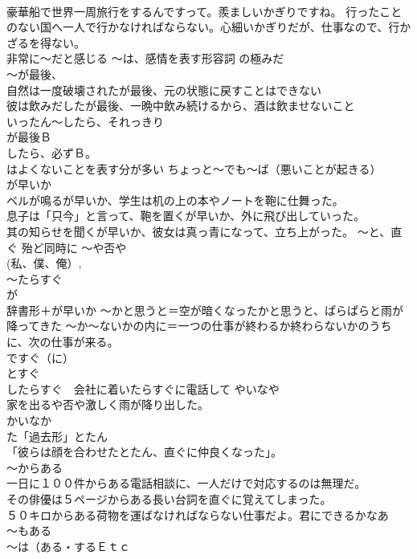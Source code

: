 \documentclass[8pt]{extreport}
\begin{document}
\begin{CJK}{UTF8}{min}
\\	豪華船で世界一周旅行をするんですって。羨ましいかぎりですね。 行ったことのない国へ一人で行かなければならない。心細いかぎりだが、仕事なので、行かざるを得ない。 
\\	非常に～だと感じる ～は、感情を表す形容詞	の極みだ
\\	～が最後、	
\\	自然は一度破壊されたが最後、元の状態に戻すことはできない 
\\	彼は飲みだしたが最後、一晩中飲み続けるから、酒は飲ませないこと 
\\	いったん～したら、それっきり 
\\	が最後Ｂ　　
\\	したら、必ずＢ。　　
\\	はよくないことを表す分が多い	ちょっと～でも～ば（悪いことが起きる）
\\	が早いか
\\	ベルが鳴るが早いか、学生は机の上の本やノートを鞄に仕舞った。
\\	息子は「只今」と言って、鞄を置くが早いか、外に飛び出していった。 
\\	其の知らせを聞くが早いか、彼女は真っ青になって、立ち上がった。	～と、直ぐ 殆ど同時に ～や否や 
\\	(私、僕、俺）,
\\	～たらすぐ 
\\	が 
\\	辞書形＋が早いか	～かと思うと＝空が暗くなったかと思うと、ぱらぱらと雨が降ってきた ～か～ないかの内に＝一つの仕事が終わるか終わらないかのうちに、次の仕事が来る。 
\\	ですぐ（に）　
\\	とすぐ　
\\	したらすぐ　会社に着いたらすぐに電話して やいなや　
\\	家を出るや否や激しく雨が降り出した。
\\	かいなか 
\\	た「過去形」とたん　
\\	「彼らは顔を合わせたとたん、直ぐに仲良くなった」。 
\\	～からある	
\\	一日に１００件からある電話相談に、一人だけで対応するのは無理だ。 
\\	その俳優は５ページからある長い台詞を直ぐに覚えてしまった。 
\\	５０キロからある荷物を運ばなければならない仕事だよ。君にできるかなあ 
\\	～もある 
\\	～は（ある・するＥｔｃ

\end{CJK}
\end{document}
